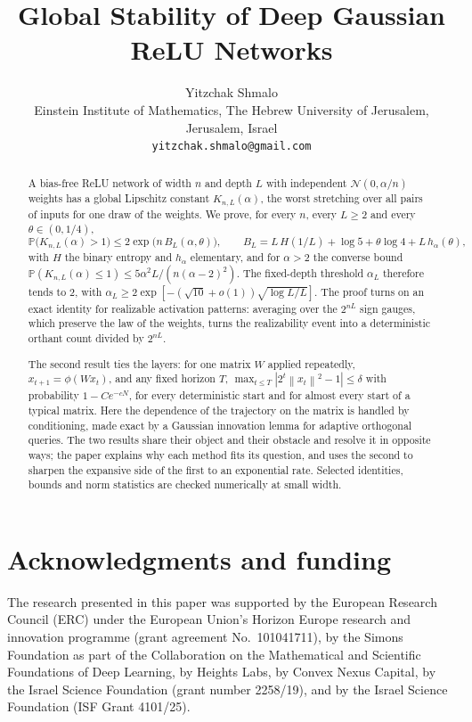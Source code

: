 \documentclass[11pt,a4paper]{article}
\title{Global Stability of Deep Gaussian ReLU Networks}
\author{Yitzchak Shmalo\\[3pt]
\small Einstein Institute of Mathematics, The Hebrew University of Jerusalem, Jerusalem, Israel\\
\small \texttt{yitzchak.shmalo@gmail.com}}
\date{}
\theoremstyle{definition}
\theoremstyle{remark}
\newcommand{\PP}{\mathbb{P}}
\newcommand{\norm}[1]{\left\lVert #1\right\rVert}
\begin{document}
\maketitle

\begin{abstract}
A bias-free ReLU network of width $n$ and depth $L$ with independent $\mathcal N(0,\alpha/n)$ weights has a global Lipschitz constant $K_{n,L}(\alpha)$, the worst stretching over all pairs of inputs for one draw of the weights. We prove, for every $n$, every $L\ge2$ and every $\theta\in(0,1/4)$,
\[
\PP\bigl(K_{n,L}(\alpha)>1\bigr)\le2\exp\!\bigl(n\,B_L(\alpha,\theta)\bigr),\qquad B_L=L\,H(1/L)+\log5+\theta\log4+L\,h_\alpha(\theta),
\]
with $H$ the binary entropy and $h_\alpha$ elementary, and for $\alpha>2$ the converse bound $\PP(K_{n,L}(\alpha)\le1)\le5\alpha^2L/(n(\alpha-2)^2)$. The fixed-depth threshold $\alpha_L$ therefore tends to $2$, with $\alpha_L\ge2\exp[-(\sqrt{10}+o(1))\sqrt{\log L/L}]$. The proof turns on an exact identity for realizable activation patterns: averaging over the $2^{nL}$ sign gauges, which preserve the law of the weights, turns the realizability event into a deterministic orthant count divided by $2^{nL}$.

The second result ties the layers: for one matrix $W$ applied repeatedly, $x_{t+1}=\phi(Wx_t)$, and any fixed horizon $T$, $\max_{t\le T}|2^t\norm{x_t}^2-1|\le\delta$ with probability $1-Ce^{-cN}$, for every deterministic start and for almost every start of a typical matrix. Here the dependence of the trajectory on the matrix is handled by conditioning, made exact by a Gaussian innovation lemma for adaptive orthogonal queries. The two results share their object and their obstacle and resolve it in opposite ways; the paper explains why each method fits its question, and uses the second to sharpen the expansive side of the first to an exponential rate. Selected identities, bounds and norm statistics are checked numerically at small width.
\end{abstract}

\tableofcontents












\section*{Acknowledgments and funding}
The research presented in this paper was supported by the European Research Council (ERC) under the European Union's Horizon Europe research and innovation programme (grant agreement No.~101041711), by the Simons Foundation as part of the Collaboration on the Mathematical and Scientific Foundations of Deep Learning, by Heights Labs, by Convex Nexus Capital, by the Israel Science Foundation (grant number 2258/19), and by the Israel Science Foundation (ISF Grant 4101/25).
\end{document}
